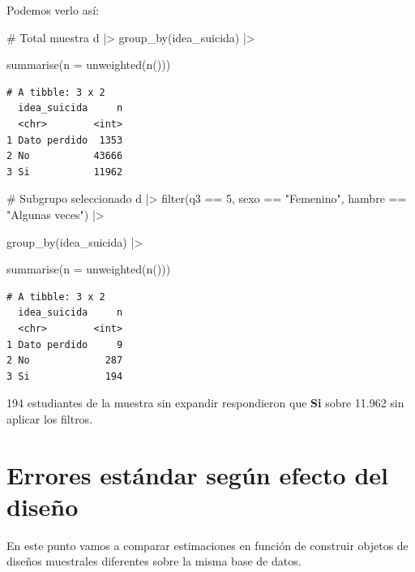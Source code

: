 \documentclass[
  spanish,
  a4paper,
]{scrbook}
\newenvironment{Shaded}{\begin{snugshade}}{\end{snugshade}}
\newcommand{\AttributeTok}[1]{\textcolor[rgb]{0.40,0.45,0.13}{#1}}
\newcommand{\CommentTok}[1]{\textcolor[rgb]{0.37,0.37,0.37}{#1}}
\newcommand{\DecValTok}[1]{\textcolor[rgb]{0.68,0.00,0.00}{#1}}
\newcommand{\FunctionTok}[1]{\textcolor[rgb]{0.28,0.35,0.67}{#1}}
\newcommand{\NormalTok}[1]{\textcolor[rgb]{0.00,0.23,0.31}{#1}}
\newcommand{\SpecialCharTok}[1]{\textcolor[rgb]{0.37,0.37,0.37}{#1}}
\newcommand{\StringTok}[1]{\textcolor[rgb]{0.13,0.47,0.30}{#1}}
\begin{document}
Podemos verlo así:

\begin{Shaded}
\begin{Highlighting}[]
\CommentTok{\# Total muestra}
\NormalTok{d }\SpecialCharTok{|\textgreater{}}
  \FunctionTok{group\_by}\NormalTok{(idea\_suicida) }\SpecialCharTok{|\textgreater{}}

  \FunctionTok{summarise}\NormalTok{(}\AttributeTok{n =} \FunctionTok{unweighted}\NormalTok{(}\FunctionTok{n}\NormalTok{()))}
\end{Highlighting}
\end{Shaded}

\begin{verbatim}
# A tibble: 3 x 2
  idea_suicida     n
  <chr>        <int>
1 Dato perdido  1353
2 No           43666
3 Si           11962
\end{verbatim}

\begin{Shaded}
\begin{Highlighting}[]
\CommentTok{\# Subgrupo seleccionado}
\NormalTok{d }\SpecialCharTok{|\textgreater{}}
  \FunctionTok{filter}\NormalTok{(q3 }\SpecialCharTok{==} \DecValTok{5}\NormalTok{, sexo }\SpecialCharTok{==} \StringTok{"Femenino"}\NormalTok{, hambre }\SpecialCharTok{==} \StringTok{"Algunas veces"}\NormalTok{) }\SpecialCharTok{|\textgreater{}}

  \FunctionTok{group\_by}\NormalTok{(idea\_suicida) }\SpecialCharTok{|\textgreater{}}

  \FunctionTok{summarise}\NormalTok{(}\AttributeTok{n =} \FunctionTok{unweighted}\NormalTok{(}\FunctionTok{n}\NormalTok{()))}
\end{Highlighting}
\end{Shaded}

\begin{verbatim}
# A tibble: 3 x 2
  idea_suicida     n
  <chr>        <int>
1 Dato perdido     9
2 No             287
3 Si             194
\end{verbatim}

194 estudiantes de la muestra sin expandir respondieron que \textbf{Si}
sobre 11.962 sin aplicar los filtros.

\section{Errores estándar según efecto del
diseño}\label{errores-estuxe1ndar-seguxfan-efecto-del-diseuxf1o}

En este punto vamos a comparar estimaciones en función de construir
objetos de diseños muestrales diferentes sobre la misma base de datos.
\end{document}
